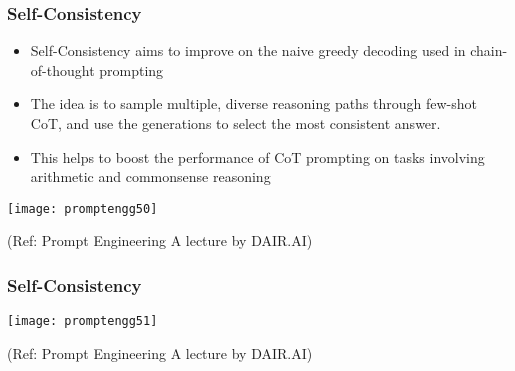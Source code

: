   
  
  









\begin{frame}[fragile]\frametitle{Self-Consistency}

\begin{itemize}
\item Self-Consistency aims to improve on the naive greedy 
decoding used in chain-of-thought prompting 
\item The idea is to sample multiple, diverse reasoning paths 
through few-shot CoT, and use the generations to select 
the most consistent answer.  
\item  This helps to boost the performance of CoT prompting on 
tasks involving arithmetic and commonsense reasoning
\end{itemize}	

\begin{center}
\texttt{[image: promptengg50]}

{\tiny (Ref: Prompt Engineering A lecture by DAIR.AI)}

\end{center}	

\end{frame}


\begin{frame}[fragile]\frametitle{Self-Consistency}

\begin{center}
\texttt{[image: promptengg51]}

{\tiny (Ref: Prompt Engineering A lecture by DAIR.AI)}

\end{center}	

\end{frame}

